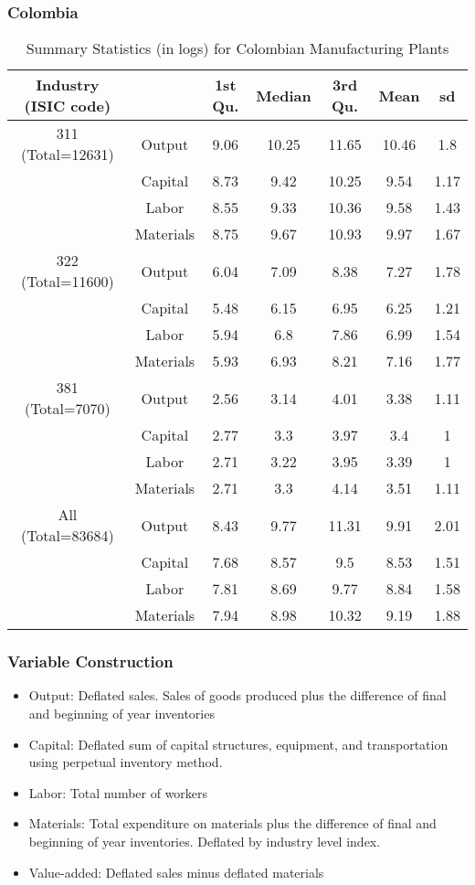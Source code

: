 \documentclass[11pt]{article}
\begin{document}
\subsubsection{Colombia}

\begin{table}[H]
\centering
\caption{Summary Statistics (in logs) for Colombian Manufacturing Plants}
\begin{tabular}{ccccccc}
  \hline\hline Industry (ISIC code) &   & 1st Qu. & Median & 3rd Qu. & Mean & sd \\ 
  \hline
311 (Total=12631) & Output & 9.06 & 10.25 & 11.65 & 10.46 & 1.8 \\ 
   & Capital & 8.73 & 9.42 & 10.25 & 9.54 & 1.17 \\ 
   & Labor & 8.55 & 9.33 & 10.36 & 9.58 & 1.43 \\ 
   & Materials & 8.75 & 9.67 & 10.93 & 9.97 & 1.67 \\ 
  322 (Total=11600) & Output & 6.04 & 7.09 & 8.38 & 7.27 & 1.78 \\ 
   & Capital & 5.48 & 6.15 & 6.95 & 6.25 & 1.21 \\ 
   & Labor & 5.94 & 6.8 & 7.86 & 6.99 & 1.54 \\ 
   & Materials & 5.93 & 6.93 & 8.21 & 7.16 & 1.77 \\ 
  381 (Total=7070) & Output & 2.56 & 3.14 & 4.01 & 3.38 & 1.11 \\ 
   & Capital & 2.77 & 3.3 & 3.97 & 3.4 & 1 \\ 
   & Labor & 2.71 & 3.22 & 3.95 & 3.39 & 1 \\ 
   & Materials & 2.71 & 3.3 & 4.14 & 3.51 & 1.11 \\ 
  All (Total=83684) & Output & 8.43 & 9.77 & 11.31 & 9.91 & 2.01 \\ 
   & Capital & 7.68 & 8.57 & 9.5 & 8.53 & 1.51 \\ 
   & Labor & 7.81 & 8.69 & 9.77 & 8.84 & 1.58 \\ 
   & Materials & 7.94 & 8.98 & 10.32 & 9.19 & 1.88 \\ 
   \hline
\end{tabular}
\label{COLsum}
\end{table}

\subsubsection*{Variable Construction}
\begin{itemize}
	\item Output: Deflated sales. Sales of goods produced plus the difference of final and beginning of year inventories
	\item Capital: Deflated sum of capital structures, equipment, and transportation using perpetual inventory method.
	\item Labor: Total number of workers
	\item Materials: Total expenditure on materials plus the difference of final and beginning of year inventories. Deflated by industry level index.
	\item Value-added: Deflated sales minus deflated materials
\end{itemize}
\end{document}
